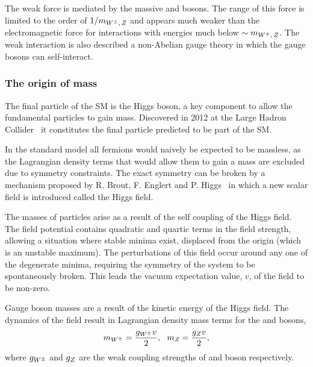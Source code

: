 The weak force is mediated by the massive \Wpm and \Z bosons. The range of this force is limited to the order of $1/m_{{W^\pm},\,{Z}}$ and appears much weaker than the electromagnetic force for interactions with energies much below $\sim m_{{W^\pm},\,{Z}}$. The weak interaction is also described a non-Abelian gauge theory in which the gauge bosons can self-interact. 



\subsubsection{The origin of mass}
The final particle of the SM is the Higgs boson, a key component to allow the fundamental particles to gain mass. Discovered in 2012 at the Large Hadron Collider~\cite{20121,201230} it constitutes the final particle predicted to be part of the SM. 

In the standard model all fermions would naively be expected to be massless, as the Lagrangian density terms that would allow them to gain a mass are excluded due to symmetry constraints. The exact symmetry can be broken by a mechanism proposed by R. Brout, F. Englert and P. Higgs~\cite{PhysRevLett.13.508,PhysRevLett.13.321} in which a new scalar field is introduced called the Higgs field. 

The masses of particles arise as a result of the self coupling of the Higgs field. The field potential contains quadratic and quartic terms in the field strength, allowing a situation where stable minima exist, displaced from the origin (which is an unstable maximum). The perturbations of this field occur around any one of the degenerate minima, requiring the symmetry of the system to be spontaneously broken. This leads the vacuum expectation value, $v$, of the field to be non-zero.   

Gauge boson masses are a result of the kinetic energy of the Higgs field. The dynamics of the field result in Lagrangian density mass terms for the \Wpm and \Z bosons,
\begin{equation}
m_{{W^\pm}} = \frac{g_{{W^\pm}}v}{2}, ~~m_{{Z}} = \frac{g_{{Z}}v}{2}, 
\end{equation}
where $g_{{W^\pm}}$ and $g_{{Z}}$ are the weak coupling strengths of \Wpm and \Z boson respectively.


